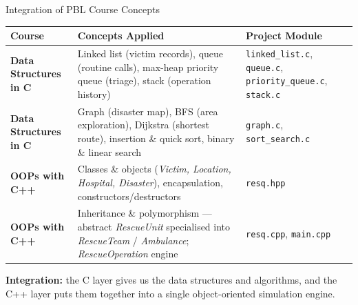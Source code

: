 \documentclass[aspectratio=169,11pt]{beamer}
\begin{document}
\begin{frame}[shrink=10]{Integration of PBL Course Concepts}
\scriptsize
\begin{center}
\renewcommand{\arraystretch}{1.15}
\begin{tabularx}{.97\textwidth}{@{}>{\bfseries}p{2.7cm}X p{3.1cm}@{}}
\toprule
Course & Concepts Applied & Project Module\\
\midrule
Data Structures in C & Linked list (victim records), queue (routine calls),
max-heap priority queue (triage), stack (operation history) &
\texttt{linked\_list.c}, \texttt{queue.c}, \texttt{priority\_queue.c}, \texttt{stack.c}\\
Data Structures in C & Graph (disaster map), BFS (area exploration), Dijkstra (shortest route),
insertion \& quick sort, binary \& linear search &
\texttt{graph.c}, \texttt{sort\_search.c}\\
\midrule
OOPs with C++ & Classes \& objects (\textit{Victim, Location, Hospital, Disaster}),
encapsulation, constructors/destructors &
\texttt{resq.hpp}\\
OOPs with C++ & Inheritance \& polymorphism --- abstract \textit{RescueUnit} specialised
into \textit{RescueTeam} / \textit{Ambulance}; \textit{RescueOperation} engine &
\texttt{resq.cpp}, \texttt{main.cpp}\\
\bottomrule
\end{tabularx}
\end{center}
\vspace{1mm}
\begin{center}
\colorbox{GEULightBlue}{\parbox{.88\textwidth}{\centering
\textbf{Integration:} the C layer gives us the data structures and algorithms, and the C++ layer puts
them together into a single object-oriented simulation engine.}}
\end{center}
\end{frame}
\end{document}

